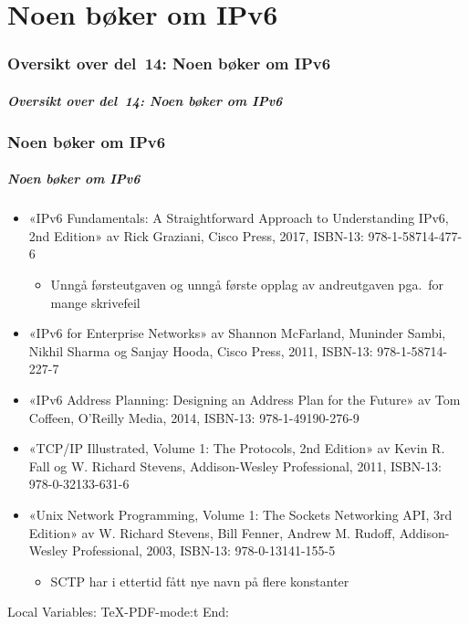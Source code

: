 \part{Noen bøker om IPv6}

\begin{frame}
  \partpage
\end{frame}

\section*{Oversikt over del~14: Noen bøker om IPv6}
\begin{frame}[allowframebreaks]
  \frametitle{Oversikt over del~14: Noen bøker om IPv6}
    \tableofcontents%
\end{frame}

\section{Noen bøker om IPv6}
\begin{frame}%
  \frametitle{Noen bøker om IPv6}
  \begin{itemize}%
  \item «IPv6 Fundamentals: A Straightforward Approach to
    Understanding IPv6, 2nd Edition» av Rick Graziani, Cisco Press,
    2017, ISBN-13: 978-1-58714-477-6
    \begin{itemize}%
    \item Unngå førsteutgaven og unngå første opplag av andreutgaven
      pga.\ for mange skrivefeil
    \end{itemize}
  \item «IPv6 for Enterprise Networks» av Shannon McFarland, Muninder
    Sambi, Nikhil Sharma og Sanjay Hooda, Cisco Press, 2011, ISBN-13:
    978-1-58714-227-7
  \item «IPv6 Address Planning: Designing an Address Plan for the
    Future» av Tom Coffeen, O'Reilly Media, 2014, ISBN-13:
    978-1-49190-276-9
  \item «TCP/IP Illustrated, Volume 1: The Protocols, 2nd Edition» av
    Kevin R. Fall og W. Richard Stevens, Addison-Wesley Professional,
    2011, ISBN-13: 978-0-32133-631-6
  \item «Unix Network Programming, Volume 1: The Sockets Networking
    API, 3rd Edition» av W. Richard Stevens, Bill Fenner, Andrew
    M. Rudoff, Addison-Wesley Professional, 2003, ISBN-13: 978-0-13141-155-5
    \begin{itemize}%
    \item SCTP har i ettertid fått nye navn på flere konstanter
    \end{itemize}
  \end{itemize}
\end{frame}



Local Variables:
TeX-PDF-mode:t
End:
